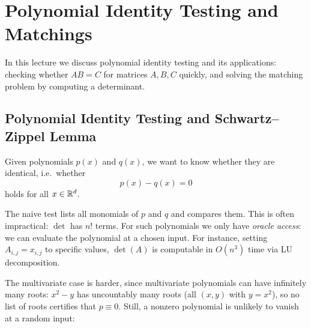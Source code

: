 % 
\chapter{Polynomial Identity Testing and Matchings}

In this lecture we discuss polynomial identity testing and its applications:
checking whether $AB = C$ for matrices $A, B, C$ quickly, and solving the
matching problem by computing a determinant.

\section{Polynomial Identity Testing and Schwartz--Zippel Lemma}

Given polynomials $p(x)$ and $q(x)$, we want to know whether they are identical,
i.e.\ whether
\[
p(x) - q(x) = 0
\]
holds for all $x \in \mathbb{R}^d$.



The naive test lists all monomials of $p$ and $q$ and compares them. This is
often impractical: $\det$ has $n!$ terms. For such polynomials we only have
\emph{oracle access}: we can evaluate the polynomial at a chosen input. For
instance, setting $A_{i,j} = x_{i,j}$ to specific values, $\det(A)$ is computable
in $O(n^3)$ time via LU decomposition.



The multivariate case is harder, since multivariate polynomials can have
infinitely many roots: $x^2 - y$ has uncountably many roots (all $(x,y)$ with
$y = x^2$), so no list of roots certifies that $p \equiv 0$. Still, a nonzero
polynomial is unlikely to vanish at a random input:

